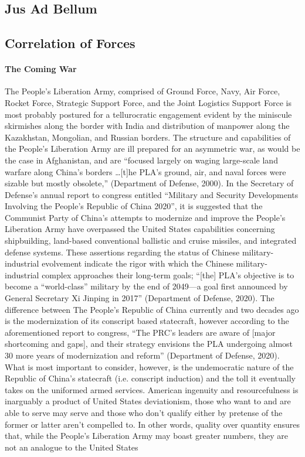 \documentclass[12pt]{article}
\begin{document}
\begin{center}
    \section{Jus Ad Bellum}
\end{center}
\begin{center}
\subsection{Correlation of Forces}
\end{center}

\paragraph{The Coming War} The People's Liberation Army, comprised of Ground Force, Navy, Air Force, Rocket Force, Strategic Support Force, and the Joint Logistics Support Force is most probably postured for a tellurocratic engagement evident by the miniscule skirmishes along the border with India and distribution of manpower along the Kazakhstan, Mongolian, and Russian borders. The structure and capabilities of the People's Liberation Army are ill prepared for an asymmetric war, as would be the case in Afghanistan, and are “focused largely on waging large-scale land warfare along China’s borders \dots [t]he PLA’s ground, air, and naval forces were sizable but mostly obsolete,” (Department of Defense, 2000). In the Secretary of Defense's annual report to congress entitled “Military and Security Developments Involving the People’s Republic of China 2020”, it is suggested that the Communist Party of China's attempts to modernize and improve the People's Liberation Army have overpassed the United States capabilities concerning shipbuilding, land-based conventional ballistic and cruise missiles, and integrated defense systems. These assertions regarding the status of Chinese military-industrial evolvement indicate the rigor with which the Chinese military-industrial complex approaches their long-term goals; “[the] PLA's objective is to become a “world-class” military by the end of 2049—a goal first announced by General Secretary Xi Jinping in 2017” (Department of Defense, 2020). The difference between The People's Republic of China currently and two decades ago is the modernization of its conscript based statecraft, however according to the aforementioned report to congress, “The PRC's leaders are aware of [major shortcoming and gaps], and their strategy envisions the PLA undergoing almost 30 more years of modernization and reform” (Department of Defense, 2020). What is most important to consider, however, is the undemocratic nature of the Republic of China's statecraft (i.e. conscript induction) and the toll it eventually takes on the uniformed armed services. American ingenuity and resourcefulness is inarguably a product of United States deviationism, those who want to and are able to serve may serve and those who don't qualify either by pretense of the former or latter aren't compelled to. In other words, quality over quantity ensures that, while the People's Liberation Army may boast greater numbers, they are not an analogue to the United States 
\end{document}
